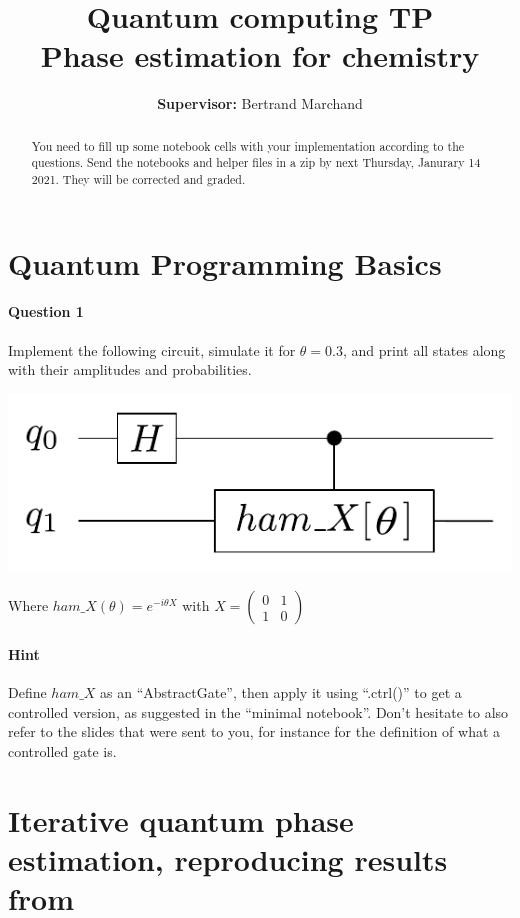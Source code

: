 \documentclass{article}
\title{Quantum computing TP\\ Phase estimation for chemistry}
\author{\textbf{Supervisor:} Bertrand Marchand}
\begin{document}
\maketitle
\begin{abstract}
You need to fill up some notebook cells with your implementation according to the questions.
Send the notebooks and helper files in a zip by next Thursday, Janurary 14 2021. They will be corrected and graded.
\end{abstract}

\section{Quantum Programming Basics}

\paragraph{Question 1} Implement the following circuit, simulate it for $\theta=0.3$, and print all states along with their amplitudes and probabilities.

\begin{center}
\includegraphics[width=.7\textwidth]{qat2pdf_llce_fji_circ.pdf}
\end{center}

Where $ham\_X(\theta) = e^{-i\theta X}$ with $X=\begin{pmatrix}0 & 1 \\ 1 & 0\end{pmatrix}$

\paragraph{Hint} Define $ham\_X$ as an ``AbstractGate'', then apply it using ``.ctrl()'' to get a controlled version, as suggested in 
the ``minimal notebook''. Don't hesitate to also refer to the slides that were sent to you, for instance for the definition of what
a controlled gate is.

\section{Iterative quantum phase estimation, reproducing results from \textcolor{blue}{\cite{o2016scalable}}}
\end{document}
